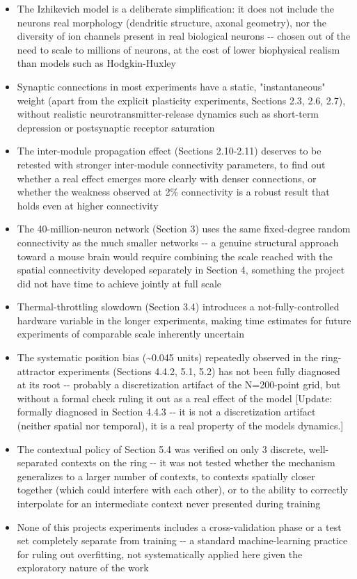 \documentclass[
  english,
]{article}
\begin{document}
\begin{itemize}
\item
  The Izhikevich model is a deliberate simplification: it does not include the neuron\textquotesingle s real morphology (dendritic structure, axonal geometry), nor the diversity of ion channels present in real biological neurons -\/- chosen out of the need to scale to millions of neurons, at the cost of lower biophysical realism than models such as Hodgkin-Huxley
\item
  Synaptic connections in most experiments have a static, "instantaneous" weight (apart from the explicit plasticity experiments, Sections 2.3, 2.6, 2.7), without realistic neurotransmitter-release dynamics such as short-term depression or postsynaptic receptor saturation
\item
  The inter-module propagation effect (Sections 2.10-2.11) deserves to be retested with stronger inter-module connectivity parameters, to find out whether a real effect emerges more clearly with denser connections, or whether the weakness observed at 2\% connectivity is a robust result that holds even at higher connectivity
\item
  The 40-million-neuron network (Section 3) uses the same fixed-degree random connectivity as the much smaller networks -\/- a genuine structural approach toward a mouse brain would require combining the scale reached with the spatial connectivity developed separately in Section 4, something the project did not have time to achieve jointly at full scale
\item
  Thermal-throttling slowdown (Section 3.4) introduces a not-fully-controlled hardware variable in the longer experiments, making time estimates for future experiments of comparable scale inherently uncertain
\item
  The systematic position bias (\textasciitilde0.045 units) repeatedly observed in the ring-attractor experiments (Sections 4.4.2, 5.1, 5.2) has not been fully diagnosed at its root -\/- probably a discretization artifact of the N=200-point grid, but without a formal check ruling it out as a real effect of the model {[}Update: formally diagnosed in Section 4.4.3 -\/- it is not a discretization artifact (neither spatial nor temporal), it is a real property of the model\textquotesingle s dynamics.{]}
\item
  The contextual policy of Section 5.4 was verified on only 3 discrete, well-separated contexts on the ring -\/- it was not tested whether the mechanism generalizes to a larger number of contexts, to contexts spatially closer together (which could interfere with each other), or to the ability to correctly interpolate for an intermediate context never presented during training
\item
  None of this project\textquotesingle s experiments includes a cross-validation phase or a test set completely separate from training -\/- a standard machine-learning practice for ruling out overfitting, not systematically applied here given the exploratory nature of the work
\end{itemize}
\end{document}
